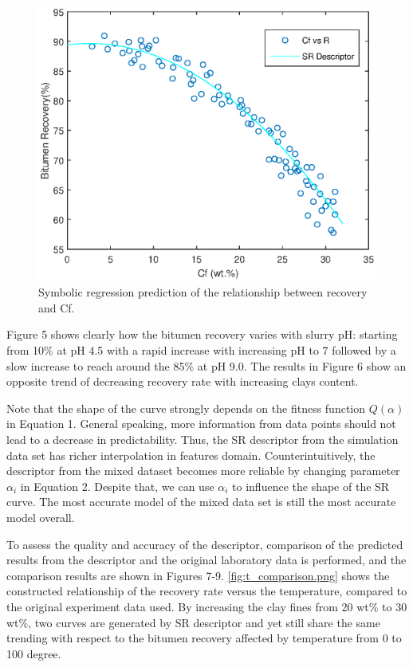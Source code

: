 \documentclass[10pt,journal,compsoc]{IEEEtran}
\begin{document}
  
  \begin{figure}[tb]
  	\centering
  	\includegraphics[width=\linewidth,clip]{Cf_SR.eps}
  	\vspace{-2em}
  	\caption{Symbolic regression prediction of the relationship between recovery and Cf.}
  	\label{fig:CF_SR}
  \end{figure}


Figure 5 shows clearly how the bitumen recovery varies with slurry pH: starting from 10\%  at pH 4.5 with a rapid increase with increasing pH to 7 followed by a slow increase to reach around the 85\%  at pH 9.0. The results in Figure 6  show an opposite trend of decreasing recovery rate with increasing clays content.

Note that the shape of the curve strongly depends on the
fitness function $Q(\alpha)$ in Equation 1. General speaking, more information from data points should not lead to a decrease in predictability.
Thus, the SR descriptor from the simulation data set has richer interpolation in features domain. Counterintuitively, the descriptor from the mixed dataset becomes more reliable by changing parameter $\alpha_i$ in Equation 2. Despite that, we can use $\alpha_i$ to influence the shape of the SR curve. The most accurate model of the mixed data
set is still the most accurate model overall.


To assess the quality and accuracy of the descriptor, comparison of the predicted results from the descriptor and the original laboratory data is performed, and the comparison results are shown in Figures 7-9. \autoref{fig:t_comparison.png} shows the constructed relationship of the recovery rate versus the temperature, compared to the original experiment data used. By increasing the clay fines from 20 wt\% to 30 wt\%, two curves are generated by SR descriptor and yet still share the same trending with respect to the bitumen recovery affected by temperature from 0 to 100 degree.
\end{document}
